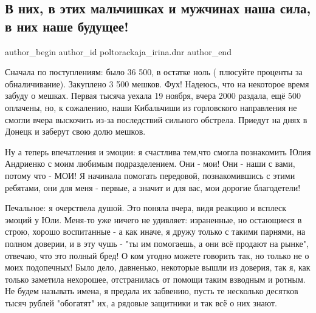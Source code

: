  
 
 
 
 
 
\subsection{В них, в этих мальчишках и мужчинах  наша сила, в них наше будущее!}
\label{sec:24_11_2021.fb.poltorackaja_irina.dnr.1.zaschitniki}
 
\ifcmt
 author_begin
   author_id poltorackaja_irina.dnr
 author_end
\fi

Сначала по поступлениям: было 36 500, в остатке ноль ( плюсуйте проценты за
обналичивание). Закуплено 3 500 мешков. Фух! Надеюсь, что на некоторое время
забуду о мешках. Первая тысяча уехала 19 ноября, вчера 2000 раздала, ещё 500
оплачены, но, к сожалению, наши Кибальчиши из горловского направления не смогли
вчера выскочить из-за последствий сильного обстрела. Приедут на днях в Донецк и
заберут свою долю мешков.


Ну а теперь впечатления и эмоции: я счастлива тем,что смогла познакомить Юлия
Андриенко с моим любимым подразделением. Они - мои! Они - наши с вами, потому
что - МОИ! Я начинала помогать передовой, познакомившись с этими ребятами, они
для меня - первые, а значит и для вас, мои дорогие благодетели!


Печальное: я очерствела душой. Это поняла вчера, видя реакцию и всплеск эмоций
у Юли. Меня-то уже ничего не удивляет: израненные, но остающиеся в строю,
хорошо воспитанные - а как иначе, я дружу только с такими парнями, на полном
доверии, и в эту чушь - "ты им помогаешь, а они всё продают на рынке", отвечаю,
что это полный бред! О ком угодно можете говорить так, но только не о моих
подопечных! Было дело, давненько, некоторые вышли из доверия, так я, как только
заметила нехорошее, отстранилась от помощи таким взводным и ротным. Не будем
называть имена, я предала их забвению, пусть те несколько десятков тысяч рублей
"обогатят" их, а рядовые защитники и так всё о них знают.

